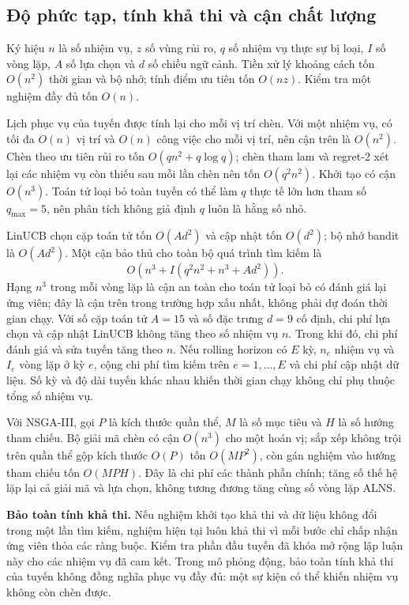\documentclass[11pt,a4paper]{article}
\begin{document}
\subsection{Độ phức tạp, tính khả thi và cận chất lượng}
Ký hiệu $n$ là số nhiệm vụ, $z$ số vùng rủi ro, $q$ số nhiệm vụ thực sự bị loại, $I$ số vòng lặp, $A$ số lựa chọn và $d$ số chiều ngữ cảnh. Tiền xử lý khoảng cách tốn $O(n^2)$ thời gian và bộ nhớ; tính điểm ưu tiên tốn $O(nz)$. Kiểm tra một nghiệm đầy đủ tốn $O(n)$.

Lịch phục vụ của tuyến được tính lại cho mỗi vị trí chèn. Với một nhiệm vụ, có tối đa $O(n)$ vị trí và $O(n)$ công việc cho mỗi vị trí, nên cận trên là $O(n^2)$. Chèn theo ưu tiên rủi ro tốn $O(qn^2+q\log q)$; chèn tham lam và regret-2 xét lại các nhiệm vụ còn thiếu sau mỗi lần chèn nên tốn $O(q^2n^2)$. Khởi tạo có cận $O(n^3)$. Toán tử loại bỏ toàn tuyến có thể làm $q$ thực tế lớn hơn tham số $q_{\max}=5$, nên phân tích không giả định $q$ luôn là hằng số nhỏ.

LinUCB chọn cặp toán tử tốn $O(Ad^2)$ và cập nhật tốn $O(d^2)$; bộ nhớ bandit là $O(Ad^2)$. Một cận bảo thủ cho toàn bộ quá trình tìm kiếm là
\begin{equation}
 O\!\left(n^3+I\left(q^2n^2+n^3+Ad^2\right)\right).
\end{equation}
Hạng $n^3$ trong mỗi vòng lặp là cận an toàn cho toán tử loại bỏ có đánh giá lại ứng viên; đây là cận trên trong trường hợp xấu nhất, không phải dự đoán thời gian chạy. Với số cặp toán tử $A=15$ và số đặc trưng $d=9$ cố định, chi phí lựa chọn và cập nhật LinUCB không tăng theo số nhiệm vụ $n$. Trong khi đó, chi phí đánh giá và sửa tuyến tăng theo $n$. Nếu rolling horizon có $E$ kỳ, $n_e$ nhiệm vụ và $I_e$ vòng lặp ở kỳ $e$, cộng chi phí tìm kiếm trên $e=1,\ldots,E$ và chi phí cập nhật dữ liệu. Số kỳ và độ dài tuyến khác nhau khiến thời gian chạy không chỉ phụ thuộc tổng số nhiệm vụ.

Với NSGA-III, gọi $P$ là kích thước quần thể, $M$ là số mục tiêu và $H$ là số hướng tham chiếu. Bộ giải mã chèn có cận $O(n^3)$ cho một hoán vị; sắp xếp không trội trên quần thể gộp kích thước $O(P)$ tốn $O(MP^2)$, còn gán nghiệm vào hướng tham chiếu tốn $O(MPH)$. Đây là chi phí các thành phần chính; tăng số thế hệ lặp lại cả giải mã và lựa chọn, không tương đương tăng cùng số vòng lặp ALNS.

\textbf{Bảo toàn tính khả thi.} Nếu nghiệm khởi tạo khả thi và dữ liệu không đổi trong một lần tìm kiếm, nghiệm hiện tại luôn khả thi vì mỗi bước chỉ chấp nhận ứng viên thỏa các ràng buộc. Kiểm tra phần đầu tuyến đã khóa mở rộng lập luận này cho các nhiệm vụ đã cam kết. Trong mô phỏng động, bảo toàn tính khả thi của tuyến không đồng nghĩa phục vụ đầy đủ: một sự kiện có thể khiến nhiệm vụ không còn chèn được.
\end{document}
